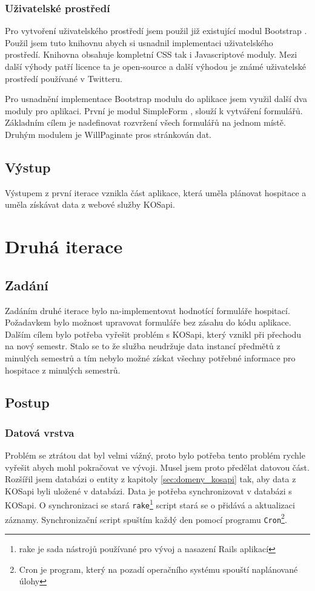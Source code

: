 \subsubsection{Uživatelské prostředí}
Pro vytvoření uživatelského prostředí jsem použil již existující modul Bootstrap \cite{bootstrap}. Použil jsem tuto knihovnu abych si usnadnil implementaci uživatelského prostředí. Knihovna obsahuje kompletní CSS tak i Javascriptové moduly. Mezi další výhody patří licence ta je open-source a další výhodou je známé uživatelské prostředí používané v Twitteru.

Pro usnadnění implementace Bootstrap modulu do aplikace jsem využil další dva moduly pro aplikaci. První je modul SimpleForm \cite{simpleform}, slouží k vytváření formulářů. Základním cílem je nadefinovat rozvržení všech formulářů na jednom místě. Druhým modulem je WillPaginate \cite{willpaginate} pros stránkován dat.

\subsection{Výstup} 
Výstupem z první iterace vznikla část aplikace, která uměla plánovat hospitace a uměla získávat data z webové služby KOSapi.


\section{Druhá iterace}
\subsection{Zadání}
Zadáním druhé iterace bylo na-implementovat hodnotící formuláře hospitací. Požadavkem bylo možnost upravovat formuláře bez zásahu do kódu aplikace. Dalším cílem bylo potřeba vyřešit problém s KOSapi, který vznikl při přechodu na nový semestr. Stalo se to že služba neudržuje data instancí předmětů z minulých semestrů a tím nebylo možné získat všechny potřebné informace pro hospitace z minulých semestrů.

\subsection{Postup}
\subsubsection{Datová vrstva}
Problém se ztrátou dat byl velmi vážný, proto bylo potřeba tento problém rychle vyřešit abych mohl pokračovat ve vývoji. Musel jsem proto předělat datovou část. Rozšířil jsem databázi o entity z kapitoly \ref{sec:domeny_kosapi} tak, aby data z KOSapi byli uložené v databázi. Data je potřeba synchronizovat v databázi s KOSapi. O synchronizaci se stará \verb|rake|\footnote{rake je sada nástrojů používané pro vývoj a nasazení Rails aplikací} script stará se o přidává a aktualizaci záznamy. Synchronizační script  spuštím každý den pomocí programu \verb|Cron|\footnote{Cron je program, který na pozadí operačního systému spouští naplánované úlohy}.

